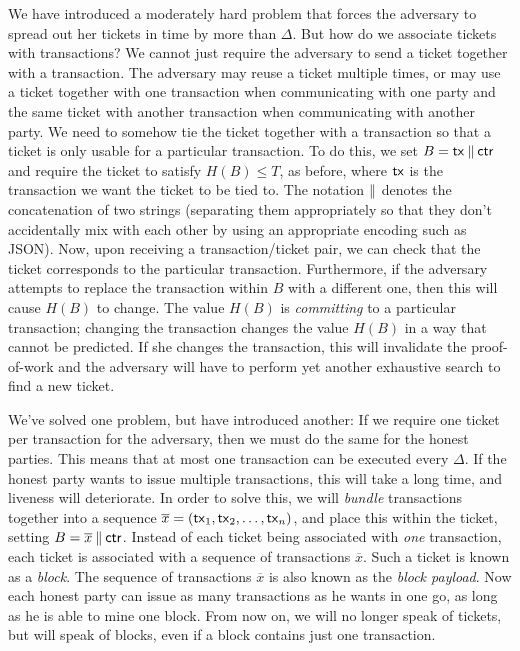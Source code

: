 We have introduced a moderately hard problem that forces the adversary to spread out her
tickets in time by more than $\Delta$. But how do we associate tickets with transactions?
We cannot just require the adversary to send a ticket together with a transaction.
The adversary may reuse a ticket multiple times, or may use a ticket together with one transaction
when communicating with one party and the same ticket with another transaction when
communicating with another party. We need to somehow tie the ticket together with a
transaction so that a ticket is only usable for a particular transaction.
To do this, we set $B = \mathsf{tx} \mathbin{\|} \mathsf{ctr}$ and require the ticket to satisfy $H(B) \leq T$,
as before, where $\mathsf{tx}$ is the transaction we want the ticket to be tied to.
The notation $\mathbin{\|}$ denotes the concatenation of two strings (separating them appropriately
so that they don't accidentally mix with each other by using an appropriate encoding such
as JSON).
Now, upon receiving a transaction/ticket pair, we can check that the ticket corresponds
to the particular transaction. Furthermore, if the adversary attempts to replace the
transaction within $B$ with a different one, then this will cause $H(B)$ to change.
The value $H(B)$ is \emph{committing} to a particular transaction; changing the transaction
changes the value $H(B)$ in a way that cannot be predicted. If she changes the transaction,
this will invalidate the proof-of-work and the adversary will have to perform yet another
exhaustive search to find a new ticket.

We've solved one problem, but have introduced another: If we require one ticket per transaction
for the adversary, then we must do the same for the honest parties. This means that at most one
transaction can be executed every $\Delta$. If the honest party wants to issue multiple transactions,
this will take a long time, and liveness will deteriorate. In order to solve this, we will \emph{bundle}
transactions together into a sequence $\overline{x} = (\mathsf{tx}_1, \mathsf{tx}_2, \ldots, \mathsf{tx}_n)$, and place
this within the ticket, setting $B = \overline{x} \mathbin{\|} \mathsf{ctr}$.
Instead of each ticket being associated with \emph{one} transaction, each ticket
is associated with a sequence of transactions $\overline{x}$.
Such a ticket is known as a \emph{block}.
The sequence of transactions $\overline{x}$ is also known as the \emph{block payload}.
Now each honest party can issue as many transactions
as he wants in one go, as long as he is able to mine one block.
From now on, we will no longer speak of tickets, but will speak of blocks,
even if a block contains just one transaction.

